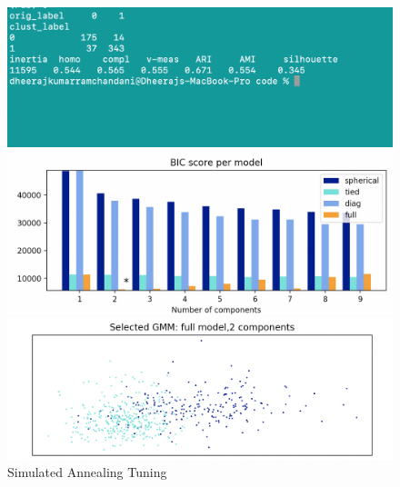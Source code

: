 \documentclass[a4paper,12pt]{article}
\begin{document}
\begin{figure}[!htb]
   \begin{minipage}{0.33\textwidth}
     \centering
     \includegraphics[width=.95\linewidth]{kmeans_cluster11}
   \end{minipage}\hfill
    \begin{minipage}{0.33\textwidth}
     \centering
     \includegraphics[width=.95\linewidth]{em_11}
     \end{minipage}\hfill
     \begin{minipage}{0.33\textwidth}
     \centering
     \includegraphics[width=.95\linewidth]{em_12}
   \end{minipage}\hfill
 \caption { Simulated Annealing Tuning}
\end{figure}
\end{document}
